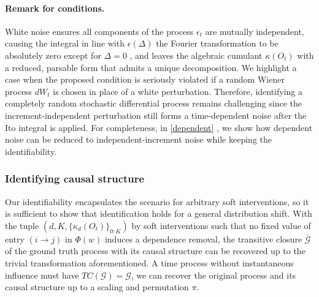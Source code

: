 \documentclass[10pt]{article}
\numberwithin{figure}{section}
\begin{document}
\paragraph{Remark for conditions.} White noise ensures all components of the process $\epsilon_t$ are mutually independent, causing the integral in line with $\epsilon(\Delta)$ the Fourier transformation to be absolutely zero except for $\Delta = 0$ , and leaves the algebraic cumulant $\kappa(O_t)$ with a reduced, parsable form that admits a unique decomposition. We highlight a case when the proposed condition is seriously violated if a random Wiener process $dW_t$ is chosen in place of a white perturbation. Therefore, identifying a completely random stochastic differential process remains challenging since the increment-independent perturbation still forms a time-dependent noise after the Ito integral is applied. For completeness,  in \ref{dependent} , we show how dependent noise can be reduced to independent-increment noise while keeping the identifiability. 



\subsubsection{Identifying causal structure}

Our identifiability encapsulates the scenario for arbitrary soft interventions, so it is sufficient to show that identification holds for a general distribution shift.
With the tuple $(d,K,\{\kappa_d(O_t)\}_{0:K})$ by soft interventions such that no fixed value of entry $(i\rightarrow j)$ in $\Phi(w)$ induces a dependence removal, the transitive closure $\bar{ \mathcal{G}}$  of the ground truth process with its causal structure can be recovered up to the trivial transformation aforementioned. A time process without instantaneous influence must have $TC(\mathcal{G})= \mathcal{G}$, we can recover the original process and its causal structure up to a scaling and permutation $\pi$. 
 
\end{document}
